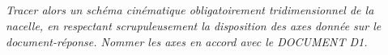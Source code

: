 \documentclass[10pt,fleqn]{article} %
\begin{document}
\subparagraph{\label{q9}}\textit{Tracer alors un schéma cinématique obligatoirement tridimensionnel de la nacelle, en respectant scrupuleusement la disposition des axes donnée sur le document-réponse. Nommer les axes en accord avec le DOCUMENT D1.}

%
%

% 
%
\end{document}
